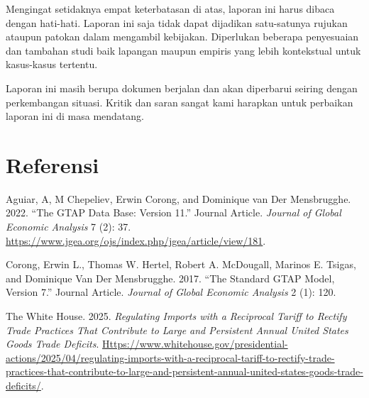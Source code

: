 \documentclass[
]{interact}
\newlength{\cslhangindent}
\newenvironment{CSLReferences}[2] %
 {\begin{list}{}{%
  \setlength{\itemindent}{0pt}
  \setlength{\leftmargin}{0pt}
  \setlength{\parsep}{0pt}
  \ifodd #1
   \setlength{\leftmargin}{\cslhangindent}
   \setlength{\itemindent}{-1\cslhangindent}
  \fi
  \setlength{\itemsep}{#2\baselineskip}}}
 {\end{list}}
\begin{document}
Mengingat setidaknya empat keterbatasan di atas, laporan ini harus
dibaca dengan hati-hati. Laporan ini saja tidak dapat dijadikan
satu-satunya rujukan ataupun patokan dalam mengambil kebijakan.
Diperlukan beberapa penyesuaian dan tambahan studi baik lapangan maupun
empiris yang lebih kontekstual untuk kasus-kasus tertentu.

Laporan ini masih berupa dokumen berjalan dan akan diperbarui seiring
dengan perkembangan situasi. Kritik dan saran sangat kami harapkan untuk
perbaikan laporan ini di masa mendatang.

\section*{Referensi}\label{referensi}

\label{refs}
\begin{CSLReferences}{1}{1}
Aguiar, A, M Chepeliev, Erwin Corong, and Dominique van Der Mensbrugghe.
2022. {``The GTAP Data Base: Version 11.''} Journal Article.
\emph{Journal of Global Economic Analysis} 7 (2): 37.
\url{https://www.jgea.org/ojs/index.php/jgea/article/view/181}.

Corong, Erwin L., Thomas W. Hertel, Robert A. McDougall, Marinos E.
Tsigas, and Dominique Van Der Mensbrugghe. 2017. {``The Standard GTAP
Model, Version 7.''} Journal Article. \emph{Journal of Global Economic
Analysis} 2 (1): 120.

The White House. 2025. \emph{Regulating Imports with a Reciprocal Tariff
to Rectify Trade Practices That Contribute to Large and Persistent
Annual United States Goods Trade Deficits}.
\href{https://www.whitehouse.gov/presidential-actions/2025/04/regulating-imports-with-a-reciprocal-tariff-to-rectify-trade-practices-that-contribute-to-large-and-persistent-annual-united-states-goods-trade-deficits/}{Https://www.whitehouse.gov/presidential-actions/2025/04/regulating-imports-with-a-reciprocal-tariff-to-rectify-trade-practices-that-contribute-to-large-and-persistent-annual-united-states-goods-trade-deficits/}.

\end{CSLReferences}
\end{document}
